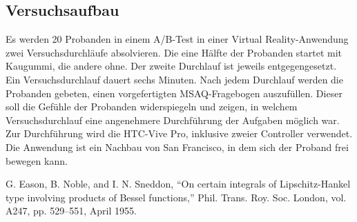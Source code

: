 \documentclass[conference]{IEEEtran}
\begin{document}
\subsection{Versuchsaufbau}
Es werden 20 Probanden in einem A/B-Test in einer Virtual Reality-Anwendung zwei Versuchsdurchläufe absolvieren. Die eine Hälfte der Probanden startet mit Kaugummi, die andere ohne. Der zweite Durchlauf ist jeweils entgegengesetzt. Ein Versuchsdurchlauf dauert sechs Minuten. Nach jedem Durchlauf werden die Probanden gebeten, einen vorgefertigten MSAQ-Fragebogen auszufüllen. Dieser soll die Gefühle der Probanden widerspiegeln und zeigen, in welchem Versuchsdurchlauf eine angenehmere Durchführung der Aufgaben möglich war. Zur Durchführung wird die HTC-Vive Pro, inklusive zweier Controller verwendet. Die Anwendung ist ein Nachbau von San Francisco, in dem sich der Proband frei bewegen kann. 




\begin{thebibliography}{00}
 G. Eason, B. Noble, and I. N. Sneddon, ``On certain integrals of Lipschitz-Hankel type involving products of Bessel functions,'' Phil. Trans. Roy. Soc. London, vol. A247, pp. 529--551, April 1955.

\end{thebibliography}
\end{document}
